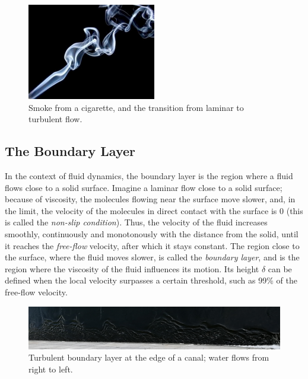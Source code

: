 \documentclass[a4paper]{book}
\begin{document}
\begin{figure}
\caption{Smoke from a cigarette, and the transition from laminar to turbulent flow.}
\label{fig:smoke}
\centering
\includegraphics[width=0.5\textwidth]{images/smoke}
\end{figure}


\subsection{The Boundary Layer}
In the context of fluid dynamics, the boundary layer is the region where a fluid flows close to a solid surface. Imagine a laminar flow close to a solid surface; because of viscosity, the molecules flowing near the surface move slower, and, in the limit, the velocity of the molecules in direct contact with the surface is 0 (this is called the \emph{non-slip condition}). Thus, the velocity of the fluid increases smoothly, continuously and monotonously with the distance from the solid, until it reaches the \emph{free-flow} velocity, after which it stays constant. The region close to the surface, where the fluid moves slower, is called the \emph{boundary layer}, and is the region where the viscosity of the fluid influences its motion. Its height $\delta$ can be defined when the local velocity surpasses a certain threshold, such as 99\% of the free-flow velocity.

\begin{figure}
\caption{Turbulent boundary layer at the edge of a canal; water flows from right to left.}
\label{fig:bl}
\centering
\includegraphics[width=\textwidth]{images/bl}
\end{figure}
\end{document}
